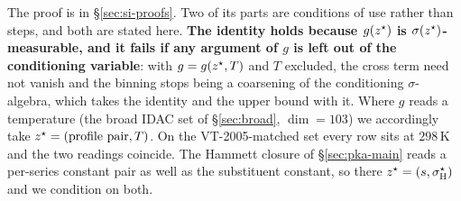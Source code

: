 \noindent The proof is in \S\ref{sec:si-proofs}. Two of its parts are conditions of use rather than
steps, and both are stated here. \textbf{The identity holds because $g(z^\star)$ is
$\sigma(z^\star)$-measurable, and it fails if any argument of $g$ is left out of the conditioning
variable}: with $g=g(z^\star,T)$ and $T$ excluded, the cross term need not vanish and the binning
stops being a coarsening of the conditioning $\sigma$-algebra, which takes the identity and the
upper bound with it. Where $g$ reads a temperature (the broad IDAC set of \S\ref{sec:broad},
$\dim=103$) we accordingly take $z^\star=(\text{profile pair},T)$. On the VT-2005-matched set every
row sits at $298$\,K and the two readings coincide. The Hammett closure of
\S\ref{sec:pka-main} reads a per-series constant pair as well as the substituent constant, so there
$z^\star=(s,\sigma_{\mathrm H}^\star)$ and we condition on both.

